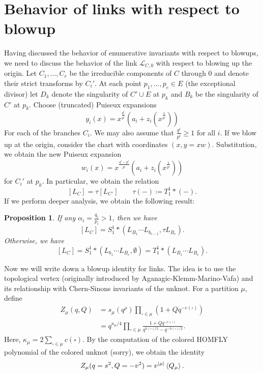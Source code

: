\documentclass{amsart}
\newtheorem{prop}[thm]{Proposition}
\theoremstyle{definition}
\theoremstyle{remark}
\theoremstyle{plain}
\theoremstyle{definition}
\theoremstyle{remark}
\newcommand{\mc}[1]{\mathcal{#1}}
\newcommand{\1}{\mathbf{1}}
\newcommand{\2}{\mathbf{2}}
\newcommand{\3}{\mathbf{3}}
\begin{document}
\section{Behavior of links with respect to blowup}%
\label{sec:behavior_of_links_with_respect_to_blowup}

Having discussed the behavior of enumerative invariants with respect to blowups, we need to discuss the behavior of the link $\mc{L}_{C,0}$ with respect to blowing up the origin. Let $C_1, \ldots, C_r$ be the irreducible components of $C$ through $0$ and denote their strict transforms by $C_i'$. At each point $p_1, \ldots, p_e \in E$ (the exceptional divisor) let $D_k$ denote the singularity of $C' \cup E$ at $p_k$ and $B_k$ be the singularity of $C'$ at $p_k$. Choose (truncated) Puiseux expansions
\[ y_i(x) = x^{\frac{q^i}{p^i}} (a_i + z_i (x^{\frac{1}{p^i}})) \]
For each of the branches $C_i$. We may also assume that $\frac{q^i}{p^i} \geq 1$ for all $i$. If we blow up at the origin, consider the chart with coordinates $(x, y = xw)$. Substitution, we obtain the new Puiseux expansion
\[ w_i(x) = x^{\frac{q^i - p^i}{p^i}} (a_i + z_i(x^{\frac{1}{p^i}})) \]
for $C_i'$ at $p_k$. In particular, we obtain the relation
\[ [L_C] = \tau [L_{C'}] \qquad \tau(-) \coloneqq T_1^1 * (-). \]
If we perform deeper analysis, we obtain the following result:

\begin{prop}
    If any $\alpha_i = \frac{q_i}{p_i} > 1$, then we have
    \[ [L_C] = S_1^1 * (L_{B_1} \cdots L_{b_{e-1}}, \tau L_{B_e}). \]
    Otherwise, we have
    \[ [L_C] = S_1^1 * (L_{b_1} \cdots L_{B_e}, \emptyset) = T_1^1 * (L_{B_1} \cdots L_{B_e}). \]
\end{prop}

Now we will write down a blowup identity for links. The idea is to use the topological vertex (originally introduced by Aganagic-Klemm-Marino-Vafa) and its relationship with Chern-Sinons invariants of the unknot. For a partition $\mu$, define
\begin{align*}
    Z_{\mu}(q, Q) &= s_{\mu}(q^{\rho}) \prod_{\square \in \mu} (1 + Q q^{-c(\square)}) \\
    &= q^{\kappa_{\mu}/4} \prod_{\square \in \mu} \frac{1 + Q q^{-c(\square)}}{q^{h(\square)/2} - q^{-h(\square)/2}}.
\end{align*}
Here, $\kappa_{\mu} = 2 \sum_{\square \in \mu} c(\square)$. By the computation of the colored HOMFLY polynomial of the colored unknot (sorry), we obtain the identity
\begin{align*}
    Z_{\mu}(q=s^2, Q=-v^2) = v^{\abs{\mu}} \ev{Q_{\mu}}.
\end{align*}
\end{document}
